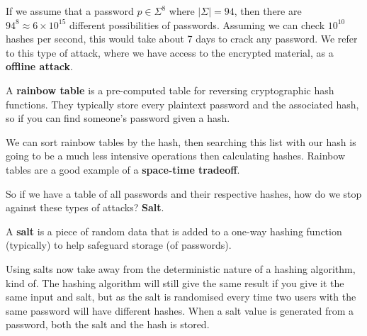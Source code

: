 \begin{example}[Breaking MD5]
    If we assume that a password $p \in \Sigma^8$ where $\lvert \Sigma \rvert = 94$, then there are $94^8 \approx 6 \times 10^{15}$ different possibilities of passwords. Assuming we can check $10^{10}$ hashes per second, this would take about 7 days to crack any password. We refer to this type of attack, where we have access to the encrypted material, as a \textbf{offline attack}.
\end{example}

\begin{definition}
    A \textbf{rainbow table} is a pre-computed table for reversing cryptographic hash functions. They typically store every plaintext password and the associated hash, so if you can find someone's password given a hash.
\end{definition}

\begin{remark}
    We can sort rainbow tables by the hash, then searching this list with our hash is going to be a much less intensive operations then calculating hashes. Rainbow tables are a good example of a \textbf{space-time tradeoff}.
\end{remark}

So if we have a table of all passwords and their respective hashes, how do we stop against these types of attacks? \textbf{Salt}.

\begin{definition}[Salt]
    A \textbf{salt} is a piece of random data that is added to a one-way hashing function (typically) to help safeguard storage (of passwords).
\end{definition}

\begin{remark}
    Using salts now take away from the deterministic nature of a hashing algorithm, kind of. The hashing algorithm will still give the same result if you give it the same input and salt, but as the salt is randomised every time two users with the same password will have different hashes. When a salt value is generated from a password, both the salt and the hash is stored.
\end{remark}
